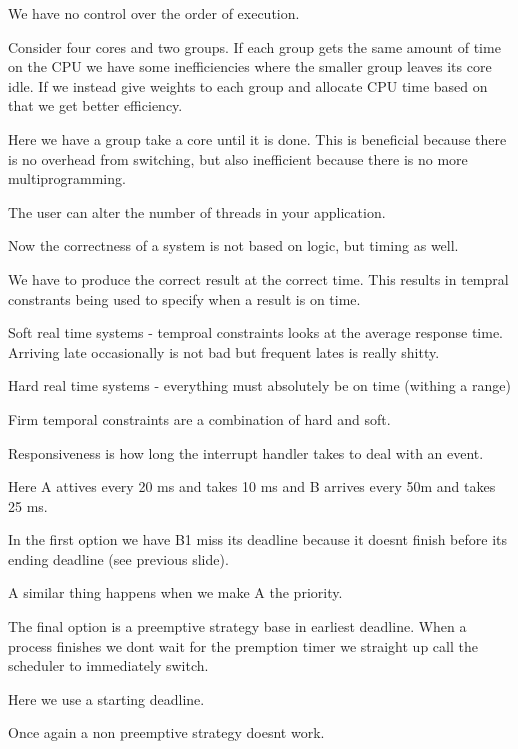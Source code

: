 \documentclass{article}
\begin{document}
We have no control over the order of execution.




Consider four cores and two groups. If each group gets the same amount of time on the CPU we have some inefficiencies where the smaller group leaves its core idle. If we instead give weights to each group and allocate CPU time based on that we get better efficiency.

Here we have a group take a core until it is done. This is beneficial because there is no overhead from switching, but also inefficient because there is no more multiprogramming.


The user can alter the number of threads in your application.

Now the correctness of a system is not based on logic, but timing as well.

We have to produce the correct result at the correct time. This results in tempral constrants being used to specify when a result is on time.

Soft real time systems - temproal constraints looks at the average response time. Arriving late occasionally is not bad but frequent lates is really shitty.

Hard real time systems - everything must absolutely be on time (withing a range)

Firm temporal constraints are a combination of hard and soft.



Responsiveness is how long the interrupt handler takes to deal with an event.










Here A attives every 20 ms and takes 10 ms and B arrives every 50m and takes 25 ms.

In the first option we have B1 miss its deadline because it doesnt finish before its ending deadline (see previous slide).

A similar thing happens when we make A the priority.

The final option is a preemptive strategy base in earliest deadline. When a process finishes we dont wait for the premption timer we straight up call the scheduler to immediately switch.

Here we use a starting deadline.

Once again a non preemptive strategy doesnt work.
\end{document}
